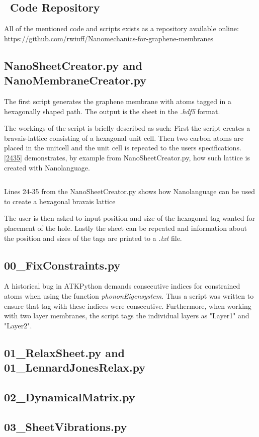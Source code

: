 \subsection{\faGithub \ Code Repository}
All of the mentioned code and scripts exists as a repository available online:\newline
\url{https://github.com/rwiuff/Nanomechanics-for-graphene-membranes}

\subsection{NanoSheetCreator.py and NanoMembraneCreator.py}\label{NSCS}
The first script generates the graphene membrane with atoms tagged in a hexagonally shaped path. The output is the sheet in the \textit{.hdf5} format.

The workings of the script is briefly described as such:
First the script creates a bravais-lattice consisting of a hexagonal unit cell. Then two carbon atoms are placed in the unitcell and the unit cell is repeated to the users specifications. \cref{2435} demonstrates, by example from NanoSheetCreator.py, how such lattice is created with Nanolanguage.
\onecolumngrid

\begin{listing}[H]
 \inputminted[python3=true,bgcolor=Black,linenos=true,firstline=24,lastline=35]{python}{Listings/NanoSheetCreator.py}
 \caption{Lines 24-35 from the NanoSheetCreator.py shows how Nanolanguage can be used to create a hexagonal bravais lattice}
 \label{2435}
\end{listing}
\twocolumngrid
The user is then asked to input position and size of the hexagonal tag wanted for placement of the hole. Lastly the sheet can be repeated and information about the position and sizes of the tags are printed to a \textit{.txt} file.

\subsection{00\_FixConstraints.py}\label{00}
A historical bug in ATKPython demands consecutive indices for constrained atoms when using the function \textit{phononEigensystem}. Thus a script was written to ensure that tag with these indices were consecutive. Furthermore, when working with two layer membranes, the script tags the individual layers as "Layer1" and "Layer2".
\subsection{01\_RelaxSheet.py and 01\_LennardJonesRelax.py}\label{01}


\subsection{02\_DynamicalMatrix.py}\label{02}
\subsection{03\_SheetVibrations.py}\label{03}
